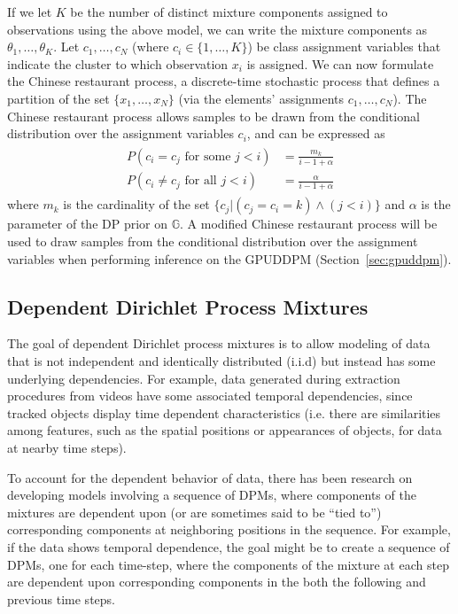 \documentclass[smallcondensed, final]{svjour3}
\begin{document}
If we let $K$ be the number of distinct mixture components assigned to observations using the above model, we can write the mixture components as $\theta_{1}, \ldots, \theta_{K}$. Let $c_{1}, \ldots, c_{N}$ (where $c_{i} \in \{1, \ldots, K \}$) be class assignment variables that indicate the cluster to which observation $x_{i}$ is assigned. We can now formulate the Chinese restaurant process, a discrete-time stochastic process that defines a partition of the set $\{ x_{1}, \ldots, x_{N} \}$ (via the elements' assignments $c_{1}, \ldots, c_{N}$). The Chinese restaurant process allows samples to be drawn from the conditional distribution over the assignment variables $c_{i}$, and can be expressed as
\begin{align}
\begin{split}
\label{crp_rep}
	P(c_{i} = c_{j} \text{  for some  } j<i) &= \frac{m_{k}}{i-1+\alpha}\\
	P(c_{i} \neq c_{j} \text{  for all  } j<i) &= \frac{\alpha}{i-1+\alpha}
\end{split}
\end{align}
where $m_{k}$ is the cardinality of the set $\{ c_{j} | (c_{j}=c_{i}=k)  \wedge  (j < i) \}$ and $\alpha$ is the parameter of the DP prior on $\mathbb{G}$. A modified Chinese restaurant process will be used to draw samples from the conditional distribution over the assignment variables when performing inference on the GPUDDPM (Section~\ref{sec:gpuddpm}).






\subsection{Dependent Dirichlet Process Mixtures}
\label{sec:ddpm}

The goal of dependent Dirichlet process mixtures is to allow modeling of data that is not independent and identically distributed (i.i.d) but instead has some underlying dependencies. For example, data generated during extraction procedures from videos have some associated temporal dependencies, since tracked objects display time dependent characteristics (i.e. there are similarities among features, such as the spatial positions or appearances of objects, for data at nearby time steps).

To account for the dependent behavior of data, there has been research on developing models involving a sequence of DPMs, where components of the mixtures are dependent upon (or are sometimes said to be ``tied to'') corresponding components at neighboring positions in the sequence. For example, if the data shows temporal dependence, the goal might be to create a sequence of DPMs, one for each time-step, where the components of the mixture at each step are dependent upon corresponding components in the both the following and previous time steps.
\end{document}
